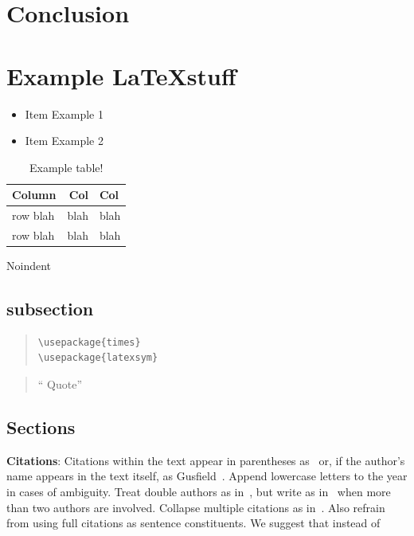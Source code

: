 \documentclass[11pt]{article}
\begin{document}
\section{Conclusion}


\section{Example \LaTeX stuff}
\begin{itemize}
\item Item Example 1
\item Item Example 2
\end{itemize}

\begin{table}[h]
\begin{center}
\begin{tabular}{|l|rl|}
\hline \bf Column & \bf Col & \bf Col \\ \hline
row blah & blah & blah \\
row blah & blah & blah \\
\hline
\end{tabular}
\end{center}
\caption{\label{font-table} Example table! }
\end{table}

\noindent Noindent


\subsection{subsection}

\begin{quote}
\begin{verbatim}
\usepackage{times}
\usepackage{latexsym}
\end{verbatim}
\end{quote}

\begin{quote}
  ``\cite{Graves:08} Quote''
\end{quote}

\subsection{Sections}

{\bf Citations}: Citations within the text appear in parentheses
as~\cite{Gusfield:97} or, if the author's name appears in the text
itself, as Gusfield~.  Append lowercase letters
to the year in cases of ambiguity.  Treat double authors as
in~\cite{Aho:72}, but write as in~\cite{Chandra:81} when more than two
authors are involved. Collapse multiple citations as
in~\cite{Gusfield:97,Aho:72}. Also refrain from using full citations
as sentence constituents. We suggest that instead of
\end{document}
